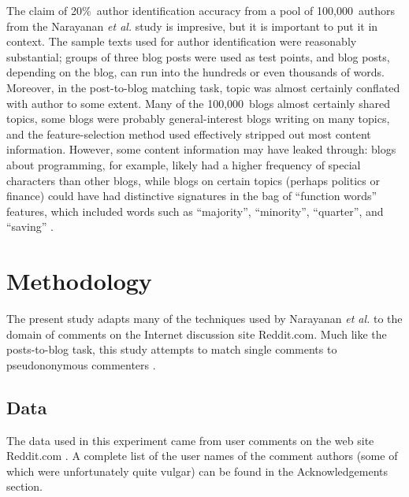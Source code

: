 \documentclass{article}
\begin{document}
The claim of 20\%~author identification accuracy from a pool of 100,000~authors from the Narayanan \textit{et al.} study is impresive, but it is important to put it in context. The sample texts used for author identification were reasonably substantial; groups of three blog posts were used as test points, and blog posts, depending on the blog, can run into the hundreds or even thousands of words. Moreover, in the post-to-blog matching task, topic was almost certainly conflated with author to some extent. Many of the 100,000~blogs almost certainly shared topics, some blogs were probably general-interest blogs writing on many topics, and the feature-selection method used effectively stripped out most content information. However, some content information may have leaked through: blogs about programming, for example, likely had a higher frequency of special characters than other blogs, while blogs on certain topics (perhaps politics or finance) could have had distinctive signatures in the bag of ``function words'' features, which included words such as ``majority'', ``minority'', ``quarter'', and ``saving'' \cite{narayanan2012feasibility}.

\section{Methodology}

The present study adapts many of the techniques used by Narayanan \textit{et al.} to the domain of comments on the Internet discussion site Reddit.com. Much like the posts-to-blog task, this study attempts to match single comments to pseudononymous commenters \cite{narayanan2012feasibility}.

\subsection{Data}
The data used in this experiment came from user comments on the web site Reddit.com \cite{reddit2012reddit}. A complete list of the user names of the comment authors (some of which were unfortunately quite vulgar) can be found in the Acknowledgements section.
\end{document}
